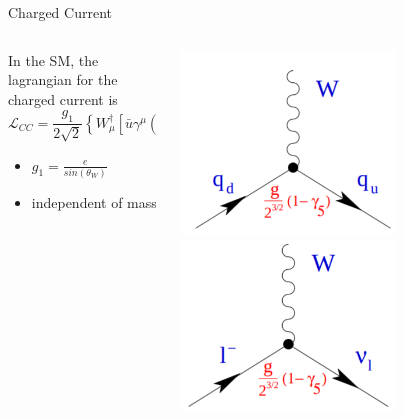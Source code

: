 \begin{frame}{Charged Current }
    \begin{columns}
        \begin{column}{0.65\textwidth}
            In the SM, the lagrangian for the charged current is \footnotemark{}
    \begin{equation*}
        \mathcal{L}_{CC} = \frac{g_1}{2 \sqrt{2}}  \left\{ W^{\dagger}_\mu \left[ \bar{u} \gamma^\mu (1-\gamma^5) d + \bar{\nu}_e \gamma^{\mu} (1-\gamma^5) e \right] \right\}
    \end{equation*}
    \begin{itemize}
        \item $g_1 = \frac{e}{sin{(\theta_W)}}$
        \item independent of mass
    \end{itemize}
        \end{column}
        \begin{column}{0.35\textwidth}
            \includegraphics[width = 0.65\textwidth]{content/images/cc1.png}
            \includegraphics[width = 0.65\textwidth]{content/images/cc2.png}
        \end{column}
    \end{columns}
\end{frame}

